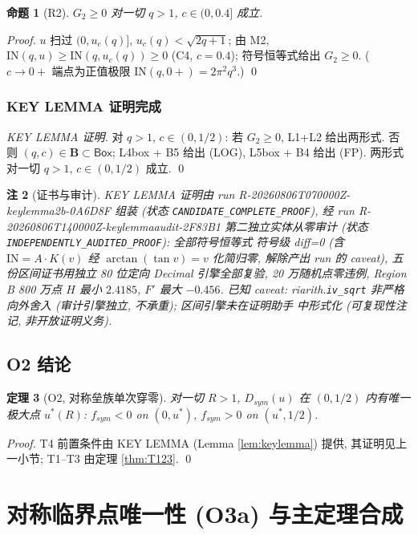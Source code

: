 \documentclass[UTF8]{ctexart}
\newtheorem{theorem}{定理}[section]
\newtheorem{proposition}[theorem]{命题}
\newtheorem{remark}[theorem]{注}
\begin{document}
\begin{proposition}[R2]
$G_2\ge0$ 对一切 $q>1$, $c\in(0,0.4]$ 成立.
\end{proposition}
\begin{proof}
$u$ 扫过 $(0,u_c(q)]$, $u_c(q)<\sqrt{2q+1}$; 由 M2, $\mathrm{IN}(q,u)\ge
\mathrm{IN}(q,u_c(q))\ge0$ (C4, $c=0.4$); 符号恒等式给出 $G_2\ge0$.
($c\to0+$ 端点为正值极限 $\mathrm{IN}(q,0+)=2\pi^2q^3$.) \qed
\end{proof}

\subsubsection{KEY LEMMA 证明完成}
\begin{proof}[KEY LEMMA 证明]
对 $q>1$, $c\in(0,1/2)$: 若 $G_2\ge0$, L1+L2 给出两形式. 否则
$(q,c)\in\mathbf B\subset\mathsf{Box}$; L4box + B5 给出 (LOG), L5box + B4 给出 (FP).
两形式对一切 $q>1$, $c\in(0,1/2)$ 成立. \qed
\end{proof}

\begin{remark}[证书与审计]
KEY LEMMA 证明由 run R-20260806T070000Z-keylemma2b-0A6D8F 组装 (状态
\texttt{CANDIDATE\_COMPLETE\_PROOF}), 经 run R-20260806T140000Z-keylemmaaudit-2F83B1
第二独立实体从零审计 (状态 \texttt{INDEPENDENTLY\_AUDITED\_PROOF}): 全部符号恒等式
符号级 diff=0 (含 $\mathrm{IN}=A\cdot K(v)$ 经 $\arctan(\tan v)=v$ 化简归零, 解除产出
run 的 caveat), 五份区间证书用独立 80 位定向 Decimal 引擎全部复验, 20 万随机点零违例,
Region B 800 万点 $H$ 最小 $2.4185$, $F'$ 最大 $-0.456$. 已知 caveat:
riarith.\texttt{iv\_sqrt} 非严格向外舍入 (审计引擎独立, 不承重); 区间引擎未在证明助手
中形式化 (可复现性注记, 非开放证明义务).
\end{remark}

\subsection{O2 结论}
\begin{theorem}[O2, 对称垒族单次穿零]
对一切 $R>1$, $D_{sym}(u)$ 在 $(0,1/2)$ 内有唯一极大点 $u^*(R)$:
$f_{sym}<0$ on $(0,u^*)$, $f_{sym}>0$ on $(u^*,1/2)$.
\end{theorem}
\begin{proof}
T4 前置条件由 KEY LEMMA (Lemma \ref{lem:keylemma}) 提供, 其证明见上一小节; T1--T3
由定理 \ref{thm:T123}. \qed
\end{proof}

\section{对称临界点唯一性 (O3a) 与主定理合成}
\end{document}
